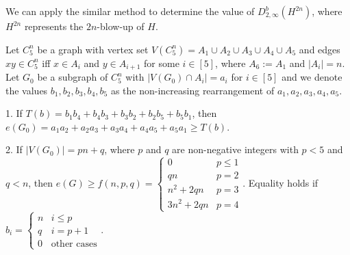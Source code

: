 \documentclass[11pt, oneside]{article}   	%
\begin{document}
We can apply the similar method to determine the value of $D_{2,\infty}^b(H^{2n})$, where $H^{2n}$ represents the $2n$-blow-up of $H$. 

\begin{lemma}
Let $C_5^n$ be a graph with vertex set $V(C_5^n)=A_1\cup A_2\cup A_3\cup A_4\cup A_5$ and edges $xy\in C_5^n$ iff $x\in A_i$ and $y\in A_{i+1}$ for some $i\in[5]$, where $A_6:=A_1$ and $|A_i|=n$. Let $G_0$ be a subgraph of $C_5^n$ with $|V(G_0)\cap A_i|=a_i$ for $i\in[5]$ and we denote the values $b_1, b_2, b_3, b_4, b_5$ as the non-increasing rearrangement of $a_1, a_2, a_3, a_4, a_5$.

1. If $T(b)=b_1b_4+b_4b_3+b_3b_2+b_2b_5+b_5b_1$, then $e(G_0)=a_1a_2+a_2a_3+a_3a_4+a_4a_5+a_5a_1\geq T(b)$.

2. If $|V(G_0)|=pn+q$, where $p$ and $q$ are non-negative integers with $p<5$ and $q<n$, then $e(G)\geq f(n,p,q)=\begin{cases}
    0 & p\leq 1\\ qn & p=2 \\ n^2+2qn & p=3\\ 3n^2+2qn & p=4
\end{cases}$. Equality holds if
$b_i=\begin{cases} n & i\leq p\\ q & i=p+1 \\ 0 & \text{other cases}\end{cases}$.
    
\end{lemma}
\end{document}
